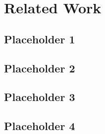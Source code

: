 \FloatBarrier
\section{Related Work}
    \subsection{Placeholder 1}
    
    \subsection{Placeholder 2}
        
    \subsection{Placeholder 3}

    \subsection{Placeholder 4}
